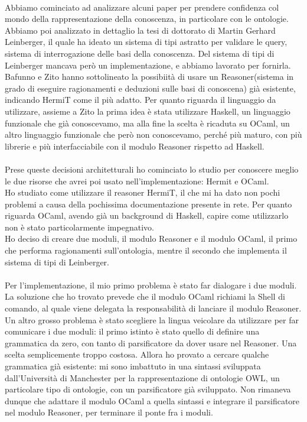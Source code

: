 \paragraph{} Abbiamo cominciato ad analizzare alcuni paper per prendere confidenza col mondo della rappresentazione della conoscenza, in particolare con le ontologie. Abbiamo poi analizzato in dettaglio la tesi di dottorato di Martin Gerhard Leinberger, il quale ha ideato un sistema di tipi astratto per validare le query, sistema di interrogazione delle basi della conoscenza. Del sistema di tipi di Leinberger mancava però un implementazione, e abbiamo lavorato per fornirla. Bafunno e Zito hanno sottolineato la possibiità di usare un Reasoner(sistema in grado di eseguire ragionamenti e deduzioni sulle basi di conoscena) già esistente, indicando HermiT come il più adatto. Per quanto riguarda il linguaggio da utilizzare, assieme a Zito la prima idea è stata utilizzare Haskell, un linguaggio funzionale che già conoscevamo, ma alla fine la scelta è ricaduta su OCaml, un altro linguaggio funzionale che però non conoscevamo, perché più maturo, con più librerie e più interfacciabile con il modulo Reasoner rispetto ad Haskell.

\paragraph{} Prese queste decisioni architetturali ho cominciato lo studio per conoscere meglio le due risorse che avrei poi usato nell'implementazione: Hermit e OCaml.\\
Ho studiato come utilizzare il reasoner HermiT, il che mi ha dato non pochi problemi  a causa della pochissima documentazione presente in rete. Per quanto riguarda OCaml, avendo già un background di Haskell, capire come utilizzarlo non è stato particolarmente impegnativo. \\
Ho deciso di creare due moduli, il modulo Reasoner e il modulo OCaml, il primo che performa ragionamenti sull'ontologia, mentre il secondo che implementa il sistema di tipi di Leinberger.

\paragraph{} Per l'implementazione, il mio primo problema è stato far dialogare i due moduli. La soluzione che ho trovato prevede che il modulo OCaml richiami la Shell di comando, al quale viene delegata la responsabilità di lanciare il modulo Reasoner. \\
Un altro grosso problema è stato scegliere la lingua veicolare da utilizzare per far comunicare i due moduli: il primo istinto è stato quello di definire una grammatica da zero, con tanto di parsificatore da dover usare nel Reasoner. Una scelta semplicemente troppo costosa. Allora ho provato a cercare qualche grammatica già esistente: mi sono imbattuto in una sintassi sviluppata dall'Università di Manchester per la rappresentazione di ontologie OWL, un particolare tipo di ontologie, con un parsificatore già sviluppato. Non rimaneva dunque che adattare il modulo OCaml a quella sintassi e integrare il parsificatore nel modulo Reasoner, per terminare il ponte fra i moduli.